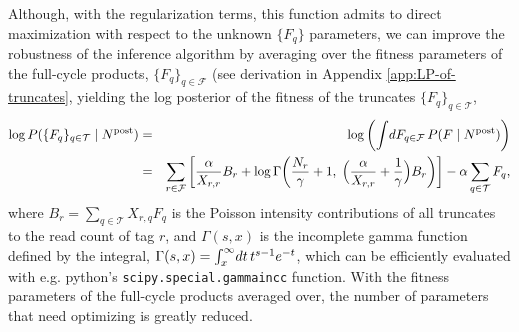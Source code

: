 \documentclass[letter,10pt,oneside]{article}
\newcommand{\bal}{\begin{eqnarray}}
\newcommand{\eal}{\end{eqnarray}}
\newcommand{\+}{^\dagger}
\begin{document}
Although, with the regularization terms, this function admits to direct maximization with respect to the unknown $\{F_q\}$ parameters, we can improve the robustness of the inference algorithm by averaging over the fitness parameters of the full-cycle products, $\{F_q\}_{q\in \mathcal{F}}$ (see derivation in Appendix \ref{app:LP-of-truncates}, yielding the log posterior of the fitness of the truncates $\{F_q\}_{q\in\mathcal{T}}$,
\bal
  \log P(\{F_q\}_{q\in\mathcal{T}}\;|\;N^\text{post}) &=& \log\left(\intop\!dF_{q\in \mathcal{F}}\, P(F\;|\;N^\text{post})\right) \\ 
  &=& \sum_{r\in\mathcal{F}}\left[\frac{\alpha}{X_{r,r}}B_r + \log\Gamma\!\left(\frac{N_r}{\gamma} + 1,\; \Big(\frac{\alpha}{X_{r,r}} + \frac{1}{\gamma}\Big) B_r\right)\right] - \alpha \sum_{q\in\mathcal{T}} F_q,
  \label{eq:log_posterior_truncated_F}
\eal
where $B_r = \sum_{q \in \mathcal{T}} X_{r,q}F_q$ is the Poisson intensity contributions of all truncates to the read count of tag $r$, and $\Gamma(s, x)$ is the incomplete gamma function defined by the integral, $\Gamma(s, x) = \intop_x^\infty\!dt\, t^{s-1} e^{-t}$, which can be efficiently evaluated with e.g. python's \texttt{scipy.special.gammaincc} function. With the fitness parameters of the full-cycle products averaged over, the number of parameters that need optimizing is greatly reduced.
\end{document}
